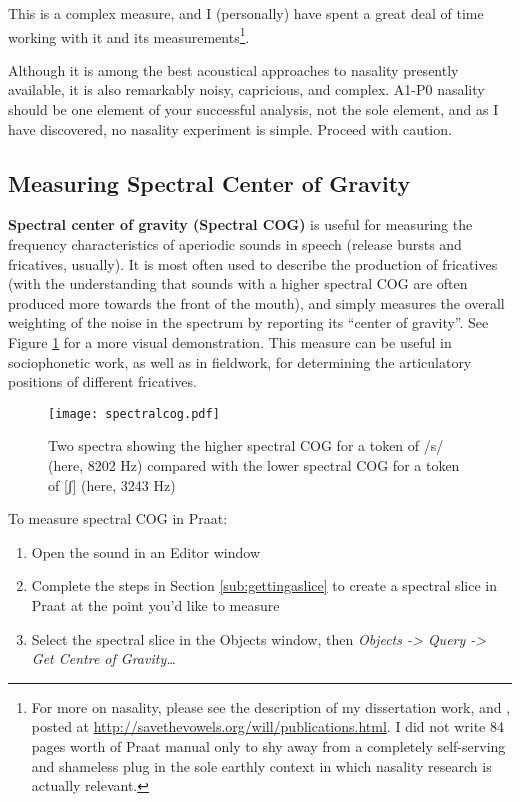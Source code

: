 This is a complex measure, and I (personally) have spent a great deal of
time working with it and its
measurements\footnote{For more on nasality, please see the description of my dissertation work, \cite{Styler:2015aa} and \cite{Styler:2017}, posted at \url{http://savethevowels.org/will/publications.html}. I did not write 84 pages worth of Praat manual only to shy away from a completely self-serving and shameless plug in the sole earthly context in which nasality research is actually relevant.}.

Although it is among the best acoustical approaches to nasality
presently available, it is also remarkably noisy, capricious, and
complex. A1-P0 nasality should be one element of your successful
analysis, not the sole element, and as I have discovered, no nasality
experiment is simple. Proceed with caution.

\hypertarget{measuring-spectral-center-of-gravity}{%
\subsection{Measuring Spectral Center of
Gravity}\label{measuring-spectral-center-of-gravity}}

\textbf{Spectral center of gravity (Spectral COG)} is useful for
measuring the frequency characteristics of aperiodic sounds in speech
(release bursts and fricatives, usually). It is most often used to
describe the production of fricatives (with the understanding that
sounds with a higher spectral COG are often produced more towards the
front of the mouth), and simply measures the overall weighting of the
noise in the spectrum by reporting its ``center of gravity''. See Figure
\ref{spectralcog} for a more visual demonstration. This measure can be
useful in sociophonetic work, as well as in fieldwork, for determining
the articulatory positions of different fricatives.\\

\begin{figure}
  \centerline{
    \mbox{\texttt{[image: spectralcog.pdf]}}
  }
  \caption{Two spectra showing the higher spectral COG for a token of /s/ (here, 8202 Hz) compared with the lower spectral COG for a token of [ʃ] (here, 3243 Hz)\label{spectralcog}}

  \end{figure}

To measure spectral COG in Praat:

\begin{enumerate}
\def\labelenumi{\arabic{enumi}.}
\tightlist
\item
  Open the sound in an Editor window
\item
  Complete the steps in Section \ref{sub:gettingaslice} to create a
  spectral slice in Praat at the point you'd like to measure
\item
  Select the spectral slice in the Objects window, then \emph{Objects
  -\textgreater{} Query -\textgreater{} Get Centre of Gravity\ldots{}}
\end{enumerate}

